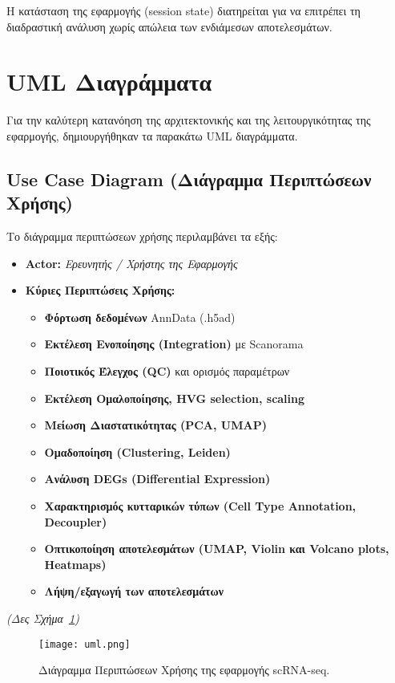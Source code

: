 \documentclass[12pt, a4paper]{article}
\begin{document}
Η κατάσταση της εφαρμογής (session state) διατηρείται για να επιτρέπει τη διαδραστική ανάλυση χωρίς απώλεια των ενδιάμεσων αποτελεσμάτων.


\section{UML Διαγράμματα}
\label{sec:uml}
Για την καλύτερη κατανόηση της αρχιτεκτονικής και της λειτουργικότητας της εφαρμογής, δημιουργήθηκαν τα παρακάτω UML διαγράμματα.

\subsection{Use Case Diagram (Διάγραμμα Περιπτώσεων Χρήσης)}
Το διάγραμμα περιπτώσεων χρήσης περιλαμβάνει τα εξής:
\begin{itemize}
    \item \textbf{Actor:} \textit{Ερευνητής / Χρήστης της Εφαρμογής}
    \item \textbf{Κύριες Περιπτώσεις Χρήσης:}
    \begin{itemize}
        \item \textbf{Φόρτωση δεδομένων} AnnData (.h5ad)
        \item \textbf{Εκτέλεση Ενοποίησης (Integration)} με Scanorama
        \item \textbf{Ποιοτικός Έλεγχος (QC)} και ορισμός παραμέτρων
        \item \textbf{Εκτέλεση Ομαλοποίησης, HVG selection, scaling}
        \item \textbf{Μείωση Διαστατικότητας (PCA, UMAP)}
        \item \textbf{Ομαδοποίηση (Clustering, Leiden)}
        \item \textbf{Ανάλυση DEGs (Differential Expression)}
        \item \textbf{Χαρακτηρισμός κυτταρικών τύπων (Cell Type Annotation, Decoupler)}
        \item \textbf{Οπτικοποίηση αποτελεσμάτων (UMAP, Violin και Volcano plots, Heatmaps)}
        \item \textbf{Λήψη/εξαγωγή των αποτελεσμάτων}
    \end{itemize}
\end{itemize}
\textit{(Δες Σχήμα~\ref{fig:use_case_diagram})}

\begin{figure}[H]
    \centering
   \texttt{[image: uml.png]}
    \caption{Διάγραμμα Περιπτώσεων Χρήσης της εφαρμογής scRNA-seq.}
    \label{fig:use_case_diagram}

\end{figure}
\end{document}
